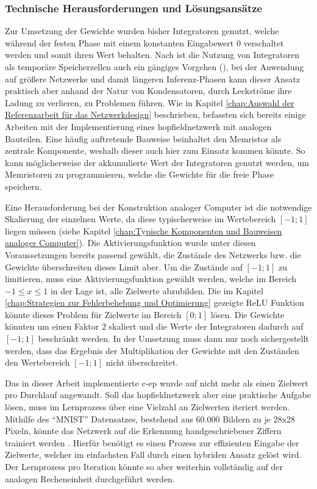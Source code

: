 \subsubsection{Technische Herausforderungen und Lösungsansätze}
\label{chap:Technische Herausforderungen und Lösungsansätze}

Zur Umsetzung der Gewichte wurden bisher Integratoren genutzt, welche während der festen Phase mit einem konstanten Eingabewert \(0\) verschaltet werden und somit ihren Wert behalten. Nach \citeauthor{Ulmann2022} ist die Nutzung von Integratoren als temporäre Speicherzellen auch ein gängiges Vorgehen (\cite[vgl. S. 92]{Ulmann2022}), bei der Anwendung auf größere Netzwerke und damit längeren Inferenz-Phasen kann dieser Ansatz praktisch aber anhand der Natur von Kondensatoren, durch Leckströme ihre Ladung zu verlieren, zu Problemen führen. Wie in Kapitel \ref{chap:Auswahl der Referenzarbeit für das Netzwerkdesign} beschrieben, befassten sich bereits einige Arbeiten mit der Implementierung eines \gls{hopfieldnetzwerk} mit analogen Bauteilen. Eine häufig auftretende Bauweise beinhaltet den Memristor als zentrale Komponente, weshalb dieser auch hier zum Einsatz kommen könnte. So kann möglicherweise der akkumulierte Wert der Integratoren genutzt werden, um Memristoren zu programmieren, welche die Gewichte für die freie Phase speichern.

Eine Herausforderung bei der Konstruktion analoger Computer ist die notwendige Skalierung der einzelnen Werte, da diese typischerweise im Wertebereich \([-1;1]\) liegen müssen (siehe Kapitel \ref{chap:Typische Komponenten und Bauweisen analoger Computer}). Die Aktivierungsfunktion wurde unter diesen Voraussetzungen bereits passend gewählt, die Zustände des Netzwerks bzw. die Gewichte überschreiten dieses Limit aber. Um die Zustände auf \([-1;1]\) zu limitieren, muss eine Aktivierungsfunktion gewählt werden, welche im Bereich \(-1\leq x\leq 1\) in der Lage ist, alle Zielwerte abzubilden. Die im Kapitel \ref{chap:Strategien zur Fehlerbehebung und Optimierung} gezeigte ReLU Funktion könnte dieses Problem für Zielwerte im Bereich \([0;1]\) lösen. Die Gewichte könnten \zb um einen Faktor \(2\) skaliert und die Werte der Integratoren dadurch auf \([-1;1]\) beschränkt werden. In der Umsetzung muss dann nur noch sichergestellt werden, dass das Ergebnis der Multiplikation der Gewichte mit den Zuständen den Wertebereich \([-1;1]\) nicht überschreitet.

Das in dieser Arbeit implementierte \gls{c-ep} wurde auf nicht mehr als einen Zielwert pro Durchlauf angewandt. Soll das \gls{hopfieldnetzwerk} aber eine praktische Aufgabe lösen, muss im Lernprozess über eine Vielzahl an Zielwerten iteriert werden. Mithilfe des "`MNIST"' Datensatzes, bestehend aus 60.000 Bildern zu je 28x28 Pixeln, könnte das Netzwerk \zb auf die Erkennung handgeschriebener Ziffern trainiert werden \cite{Deng2012}. Hierfür benötigt es einen Prozess zur effizienten Eingabe der Zielwerte, welcher im einfachsten Fall durch einen hybriden Ansatz gelöst wird. Der Lernprozess pro Iteration könnte so aber weiterhin vollständig auf der analogen Recheneinheit durchgeführt werden.
